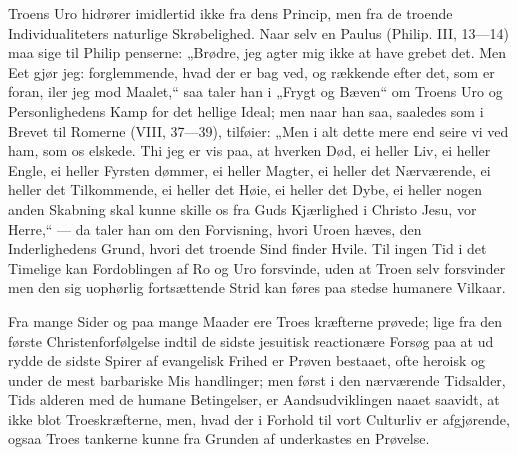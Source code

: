 \documentclass[12pt]{book}
\newcommand{\opage}[1]{\marginnote{\footnotesize\textit{[#1]}}}
\begin{document}
Troens Uro hidrører imidlertid ikke fra dens Princip,
men fra de troende Individualiteters naturlige Skrøbelighed.
Naar selv en Paulus (Philip. III, 13---14) maa sige til Philip\-%
penserne: „Brødre, jeg agter mig ikke at have grebet
det. Men Eet gjør jeg: forglemmende, hvad der er bag\-%
ved, og rækkende efter det, som er foran, iler jeg mod
Maalet,“ saa taler han i „Frygt og Bæven“ om Troens
Uro og Personlighedens Kamp for det hellige Ideal; men
naar han saa, saaledes som i Brevet til Romerne (VIII,
37---39), tilføier: „Men i alt dette mere end seire vi ved
ham, som os elskede. Thi jeg er vis paa, at hverken
Død, ei heller Liv, ei heller Engle, ei heller Fyrsten\-%
dømmer, ei heller Magter, ei heller det Nærværende, ei
\opage{277}\setcounter{footnote}{0}%
heller det Tilkommende, ei heller det Høie, ei heller det
Dybe, ei heller nogen anden Skabning skal kunne skille
os fra Guds Kjærlighed i Christo Jesu, vor Herre,“ ---
da taler han om den Forvisning, hvori Uroen hæves, den
Inderlighedens Grund, hvori det troende Sind finder
Hvile. Til ingen Tid i det Timelige kan Fordoblingen
af Ro og Uro forsvinde, uden at Troen selv forsvinder
men den sig uophørlig fortsættende Strid kan føres paa
stedse humanere Vilkaar.

Fra mange Sider og paa mange Maader ere Troes\-%
kræfterne prøvede; lige fra den første Christenforfølgelse
indtil de sidste jesuitisk reactionære Forsøg paa at ud\-%
rydde de sidste Spirer af evangelisk Frihed er Prøven
bestaaet, ofte heroisk og under de mest barbariske Mis\-%
handlinger; men først i den nærværende Tidsalder, Tids\-%
alderen med de humane Betingelser, er Aandsudviklingen
naaet saavidt, at ikke blot Troeskræfterne, men, hvad der
i Forhold til vort Culturliv er afgjørende, ogsaa Troes\-%
tankerne kunne fra Grunden af underkastes en Prøvelse.
\end{document}
